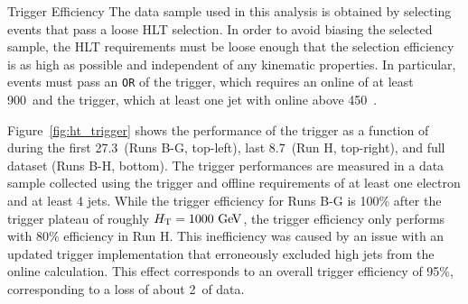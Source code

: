 \begin{section}{Trigger Efficiency}
The data sample used in this analysis is obtained by selecting events that pass a loose HLT selection.
In order to avoid biasing the selected sample, the HLT requirements must be loose enough that the selection efficiency is as high as possible and independent of any kinematic properties.
In particular, events must pass an \texttt{OR} of the \trigHT trigger, which requires an online \HT of at least 900~\GeV and the \trigJet trigger, which at least one jet with online \pT above 450~\GeV.

Figure~\ref{fig:ht_trigger} shows the performance of the \trigHT trigger as a function of \HT during the first 27.3~\ifb (Runs B-G, top-left), last 8.7~\ifb (Run H, top-right), and full dataset (Runs B-H, bottom).
The trigger performances are measured in a data sample collected using the \trigEle trigger and offline requirements of at least one electron and at least 4 jets.
While the trigger efficiency for Runs B-G is 100\% after the trigger plateau of roughly $H_{\mathrm{T}} = 1000~\mathrm{Ge\kern -0.1em V}$, the trigger efficiency only performs with 80\% efficiency in Run H.
This inefficiency was caused by an issue with an updated trigger implementation that erroneously excluded high \pT jets from the online \HT calculation.
This effect corresponds to an overall trigger efficiency of 95\%, corresponding to a loss of about 2~\ifb of data.


\end{section}
